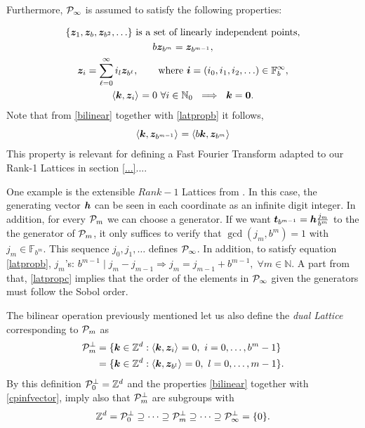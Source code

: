 \documentclass[graybox,footinfo]{svmult}
\newcommand{\Z}{\mathbb{Z}} %
\newcommand{\N}{\mathbb{N}} %
\newcommand{\F}{\mathbb{F}} %
\newcommand{\bszero}{\boldsymbol{0}} %
\newcommand{\bst}{\boldsymbol{t}}    %
\newcommand{\bsz}{\boldsymbol{z}}    %
\begin{document}
Furthermore, $\mathcal{P}_\infty$ is assumed to satisfy the following properties:

\begin{subequations} \label{cpinfvector}
\begin{gather}
\{\bsz_{1}, \bsz_{b}, \bsz_{b^2}, \ldots\} \text{ is a set of linearly independent points}, \\
b\bsz_{b^m}=\bsz_{b^{m-1}},\label{latpropb}\\
\bsz_i = \sum_{\ell=0}^{\infty} i_l \bsz_{b^\ell}, \qquad \text{where }\bsi=(i_0, i_1, i_2, \ldots ) \in \F_b^\infty, \label{latpropc}\\
\ip{\bsk}{\bsz_i} =  0 \ \forall i \in \N_0   \ \implies \ \bsk=\bszero. \label{latpropd}
\end{gather}
\end{subequations}
Note that from \eqref{bilinear} together with \eqref{latpropb} it follows,
\begin{equation}\label{assumgenip}
\ip{\bsk}{\bsz_{b^{m-1}}}=\ip{b\bsk}{\bsz_{b^m}}
\end{equation}
This property is relevant for defining a Fast Fourier Transform adapted to our Rank-1 Lattices in section \ref{...}....

One example is the extensible $Rank-1$ Lattices from \cite{HicNie03a}. In this case, the generating vector $\boldsymbol{h}$ can be seen in each coordinate as an infinite digit integer. In addition, for every $\mathcal{P}_m$ we can choose a generator. If we want $\bst_{b^{m-1}}=\bsh\frac{j_m}{b^m}$ to the the generator of $\mathcal{P}_m$, it only suffices to verify that $\gcd(j_m,b^m)=1$ with $j_m\in\F_{b^m}$. This sequence $j_0,j_1,\dots$ defines $\mathcal{P}_\infty$. In addition, to satisfy equation \eqref{latpropb},  $j_m$'s: $ b^{m-1} \mid j_m-j_{m-1}\Rightarrow j_m=j_{m-1}+b^{m-1},\;\forall m\in\N$. A part from that, \eqref{latpropc} implies that the order of the elements in $\mathcal{P}_\infty$ given the generators must follow the Sobol order.

The bilinear operation previously mentioned let us also define the \emph{dual Lattice} corresponding to $\mathcal{P}_m$ as
\begin{align}
\nonumber
\cp^{\perp}_m &= \{\bsk \in \Z^d : \ip{\bsk}{\bsz_i} = 0, \ i=0, \ldots, b^m-1\} \\
&= \{\bsk \in \Z^d : \ip{\bsk}{\bsz_{b^{l}}} = 0, \ l=0, \ldots, m-1\}.\label{dualdef}
\end{align}
By this definition $\cp^{\perp}_{0}=\Z^d$ and the properties \eqref{bilinear} together with \eqref{cpinfvector}, imply also that $\mathcal{P}^{\perp}_m$ are subgroups with
\begin{equation}\label{dualemb}
\Z^d=\cp^{\perp}_{0}\supseteq\dots\supseteq\cp^{\perp}_{m}\supseteq\dots\supseteq\cp^{\perp}_{\infty}=\{0\}.
\end{equation}
\end{document}
